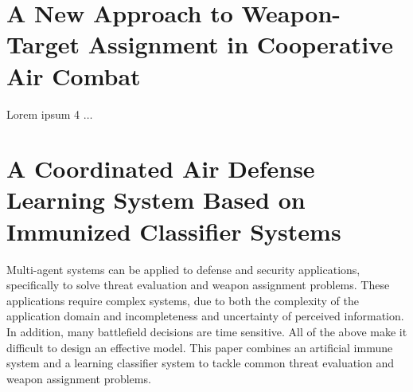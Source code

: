 \documentclass[12pt]{article} %
\begin{document}
\section*{A New Approach to Weapon-Target Assignment in Cooperative Air Combat \cite{swarmHarmony_chang_2017}}
Lorem ipsum 4 $\ldots$


\section*{A Coordinated Air Defense Learning System Based on Immunized Classifier Systems \cite{immunized_nantogma_2021}}
    
    Multi-agent systems can be applied to defense and security applications, specifically to solve threat evaluation and weapon assignment problems. These applications require complex systems, due to both the complexity of the application domain and incompleteness and uncertainty of perceived information. In addition, many battlefield decisions are time sensitive. All of the above make it difficult to design an effective model. This paper combines an artificial immune system and a learning classifier system to tackle common threat evaluation and weapon assignment problems. 
    
\end{document}
